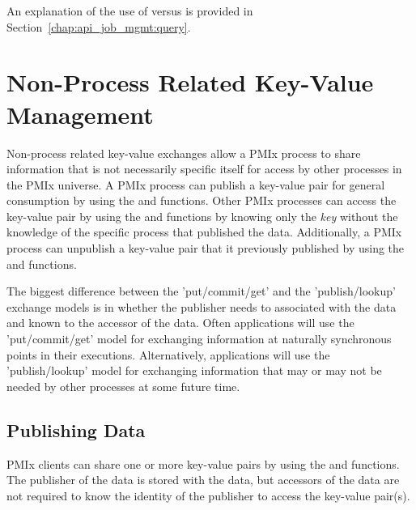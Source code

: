 \adviceuserstart
An explanation of the use of  versus  is provided in Section~\ref{chap:api_job_mgmt:query}.
\adviceuserend


\section{Non-Process Related Key-Value Management}
\label{chap:api_kv_mgmt:publish-overview}

Non-process related key-value exchanges allow a \ac{PMIx} process to share information that is not necessarily specific itself for access by other processes in the \ac{PMIx} universe.
A \ac{PMIx} process can publish a key-value pair for general consumption by using the  and  functions.
Other \ac{PMIx} processes can access the key-value pair by using the  and  functions by knowing only the \emph{key} without the knowledge of the specific process that published the data.
Additionally, a \ac{PMIx} process can unpublish a key-value pair that it previously published by using the  and  functions.

The biggest difference between the 'put/commit/get' and the 'publish/lookup' exchange models is in whether the publisher needs to associated with the data and known to the accessor of the data.
Often applications will use the 'put/commit/get' model for exchanging information at naturally synchronous points in their executions.
Alternatively, applications will use the 'publish/lookup' model for exchanging information that may or may not be needed by other processes at some future time.

\subsection{Publishing Data}
\label{chap:api_kv_mgmt:publish}

\ac{PMIx} clients can share one or more key-value pairs by using the  and  functions.
The publisher of the data is stored with the data, but accessors of the data are not required to know the identity of the publisher to access the key-value pair(s).


\subsubsection{}

